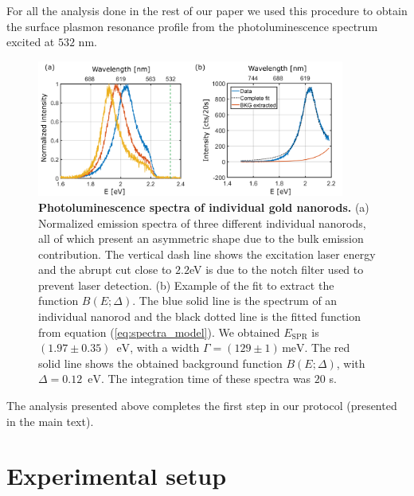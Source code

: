 \documentclass[journal=nalefd,manuscript=letter]{achemso}
\newcommand{\nm}{\ensuremath{\,\textrm{nm}}}
\newcommand{\eV}{\ensuremath{\,\textrm{eV}}}
\newcommand{\meV}{\ensuremath{\,\textrm{meV}}}
\begin{document}
For all the analysis done in the rest of our paper we used this procedure to obtain the
surface plasmon resonance profile from the photoluminescence spectrum excited at $532$ nm.

\begin{figure}[htp] \centering
\includegraphics[width=0.90\textwidth]{Figures/Supplementary/09_Error_vs_Wavelength/532nm_spectra_and_bkg.png}
\caption{\textbf{Photoluminescence spectra of individual gold nanorods.} 
(a) Normalized emission spectra of three different individual nanorods, all of which present 
an asymmetric shape due to the bulk emission contribution. The vertical dash line shows the 
excitation laser energy and the abrupt cut close to $2.2$eV is due to the notch filter used 
to prevent laser detection. (b) Example of the fit to extract the function $B(E;\Delta)$. 
The blue solid line is the spectrum of an individual nanorod and the black dotted line is the 
fitted function from equation (\ref{eq:spectra_model}). We obtained $E_\textrm{SPR}$ is $(1.97 \pm 0.35)$ \eV, 
with a width $\Gamma=(129 \pm 1) \meV$.
The red solid line shows the obtained background function $B(E;\Delta)$, with $\Delta = 0.12$ \eV. 
The integration time of these spectra was $20$ s.}
\label{fig:PL_spectra}
\end{figure}

The analysis presented above completes the  first step in our protocol 
(presented in the main text). 


\pagebreak
\section{Experimental setup}\label{sec:setup}
\end{document}
